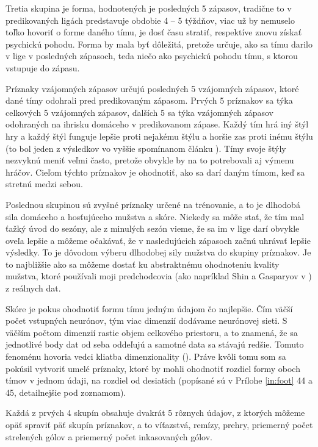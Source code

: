 Tretia skupina je forma, hodnotených je posledných 5 zápasov, tradične to v predikovaných ligách predstavuje obdobie 4 -- 5 týždňov, viac už by nemuselo toľko hovoriť o forme daného tímu, je dosť času stratiť, respektíve znovu získať psychickú pohodu. Forma by mala byť dôležitá, pretože určuje, ako sa tímu darilo v lige v posledných zápasoch, teda niečo ako psychickú pohodu tímu, s ktorou vstupuje do zápasu.

Príznaky vzájomných zápasov určujú posledných 5 vzájomných zápasov, ktoré dané tímy odohrali pred predikovaným zápasom. Prvých 5 príznakov sa týka celkových 5 vzájomných zápasov, ďalších 5 sa týka vzájomných zápasov odohraných na ihrisku domáceho v predikovanom zápase. Každý tím hrá iný štýl hry a každý štýl funguje lepšie proti nejakému štýlu a horšie zas proti inému štýlu (to bol jeden z výsledkov vo vyššie spomínanom článku \citep{related:shin}). Tímy svoje štýly nezvyknú meniť veľmi často, pretože obvykle by na to potrebovali aj výmenu hráčov. Cieľom týchto príznakov je ohodnotiť, ako sa darí daným tímom, keď sa stretnú medzi sebou.

Poslednou skupinou sú zvyšné príznaky určené na trénovanie, a to je dlhodobá sila domáceho a hosťujúceho mužstva a skóre. 
Niekedy sa môže stať, že tím mal ťažký úvod do sezóny, ale z minulých sezón vieme, že sa im v lige darí obvykle oveľa lepšie a môžeme očakávať, že v nasledujúcich zápasoch začnú uhrávať lepšie výsledky. 
To je dôvodom výberu dlhodobej sily mužstva do skupiny príznakov.
Je to najbližšie ako sa môžeme dostať ku abstraktnému ohodnoteniu kvality mužstva, ktoré používali moji predchodcovia (ako napríklad Shin a Gasparyov v \citep{related:shin}) z reálnych dat.

Skóre je pokus ohodnotiť formu tímu jedným údajom čo najlepšie.
Čím väčší počet vstupných neurónov, tým viac dimenzií dodávame neurónovej sieti.
S väčším počtom dimenzií rastie objem celkového priestoru, a to znamená, že sa jednotlivé body dat od seba oddeľujú a samotné data sa stávajú redšie.
Tomuto fenoménu hovoria vedci kliatba dimenzionality (\citep{curse}).
Práve kvôli tomu som sa pokúsil vytvoriť umelé príznaky, ktoré by mohli ohodnotiť rozdiel formy oboch tímov v jednom údaji, na rozdiel od desiatich (popísané sú v Prílohe \ref{in:foot} 44 a 45, detailnejšie pod zoznamom).

Každá z prvých 4 skupín obsahuje dvakrát 5 rôznych údajov, z ktorých môžeme opäť spraviť päť skupín príznakov, a to víťazstvá, remízy, prehry, priemerný počet strelených gólov a priemerný počet inkasovaných gólov.

